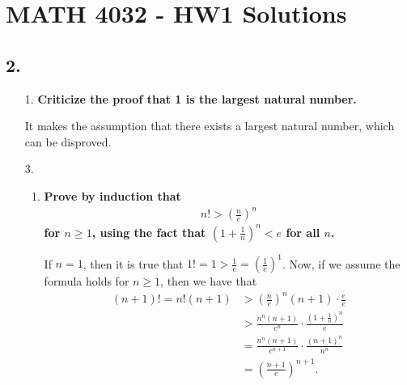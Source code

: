 \documentclass[a4paper,12pt]{article}
\begin{document}
\section*{MATH 4032 - HW1 Solutions}
\subsection*{2.}
\begin{enumerate}
    \item[1.]
        \boldmath
        \textbf{Criticize the proof that 1 is the largest natural number.} \par
        \unboldmath
        It makes the assumption that there exists a largest natural number, which can be disproved.

    \item[3.]
        \begin{enumerate}
            \item
                \boldmath
                \textbf{Prove by induction that
                \begin{align*}
                    n! > \left( \frac{n}{e} \right)^n
                \end{align*}
                for $n \geq 1$, using the fact that $(1 + \frac{1}{n})^n < e$ for all $n$.} \par
                \unboldmath
                If $n = 1$, then it is true that $1! = 1 > \frac{1}{e} = \left( \frac{1}{e} \right)^1$. Now, if we assume the formula holds for $n \geq 1$, then we have that
                \begin{align*}
                    (n + 1)!= n!(n + 1) &> \left( \frac{n}{e} \right)^n (n + 1) \cdot \frac{e}{e} \\
                    &> \frac{n^n(n + 1)}{e^n} \cdot \frac{\left( 1 + \frac{1}{n} \right)^n}{e} \\
                    &= \frac{n^n(n + 1)}{e^{n + 1}} \cdot \frac{(n + 1)^n}{n^n} \\
                    &= \left( \frac{n + 1}{e} \right)^{n + 1}.
                \end{align*}


\end{enumerate}
\end{enumerate}
\end{document}
